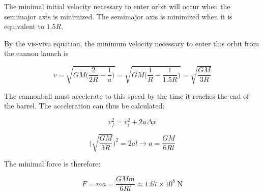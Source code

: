 \begin{solution}

The minimal initial velocity necessary to enter orbit will occur when the semimajor axis is minimized. The semimajor axis is minimized when it is equivalent to $1.5R$.

By the vis-viva equation, the minimum velocity necessary to enter this orbit from the cannon launch is 

$$v = \sqrt{GM\bigg(\frac{2}{2R}-\frac{1}{a}\bigg)} = \sqrt{GM\bigg(\frac{1}{R}-\frac{1}{1.5R}\bigg)} = \sqrt{\frac{GM}{3R}}$$

The cannonball must accelerate to this speed by the time it reaches the end of the barrel. The acceleration can thus be calculated:

$$v_f^2 = v_i^2 + 2a\Delta x$$

$$\bigg(\sqrt{\frac{GM}{3R}}\bigg)^2 = 2al\longrightarrow a = \frac{GM}{6Rl}$$

The minimal force is therefore:

$$ F = ma = \frac{GMm}{6Rl}\approx \boxed{1.67\times10^8\;\mathrm{N}}$$

\end{solution}